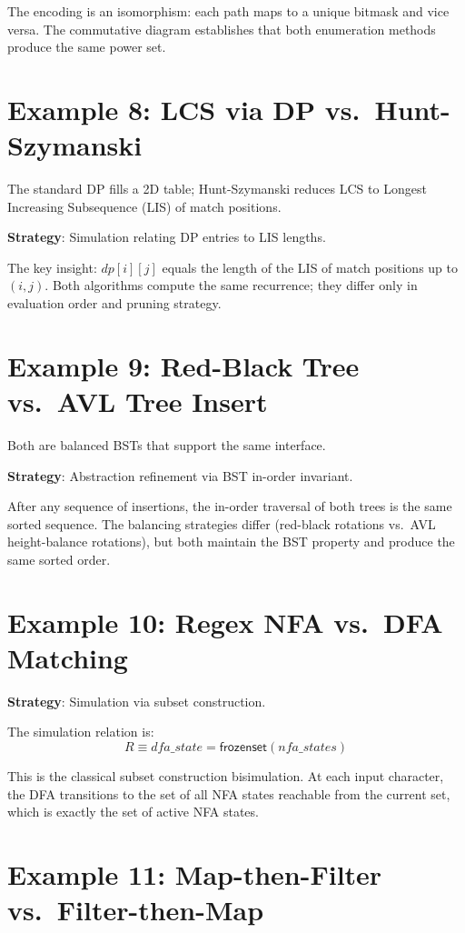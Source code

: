 The encoding is an isomorphism: each path maps to a unique bitmask
and vice versa.  The commutative diagram establishes that both
enumeration methods produce the same power set.


\section{Example 8: LCS via DP vs.\ Hunt-Szymanski}

The standard DP fills a 2D table; Hunt-Szymanski reduces LCS to
Longest Increasing Subsequence (LIS) of match positions.

\textbf{Strategy}: Simulation relating DP entries to LIS lengths.

The key insight: $\mathit{dp}[i][j]$ equals the length of the LIS of
match positions up to $(i,j)$.  Both algorithms compute the same
recurrence; they differ only in evaluation order and pruning strategy.


\section{Example 9: Red-Black Tree vs.\ AVL Tree Insert}

Both are balanced BSTs that support the same interface.

\textbf{Strategy}: Abstraction refinement via BST in-order invariant.

After any sequence of insertions, the in-order traversal of both trees
is the same sorted sequence.  The balancing strategies differ
(red-black rotations vs.\ AVL height-balance rotations), but both
maintain the BST property and produce the same sorted order.


\section{Example 10: Regex NFA vs.\ DFA Matching}

\textbf{Strategy}: Simulation via subset construction.

The simulation relation is:
\[
  R \equiv \mathit{dfa\_state} = \mathsf{frozenset}(\mathit{nfa\_states})
\]

This is the classical subset construction bisimulation.  At each input
character, the DFA transitions to the set of all NFA states reachable
from the current set, which is exactly the set of active NFA states.


\section{Example 11: Map-then-Filter vs.\ Filter-then-Map}

